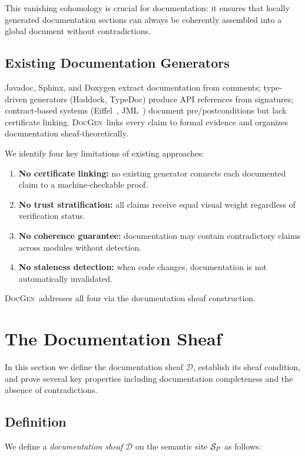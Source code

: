 \documentclass[11pt]{article}
\newcommand{\DocGen}{\textsc{DocGen}}
\newcommand{\DocSheaf}{\mathcal{D}}
\begin{document}
This vanishing cohomology is crucial for documentation: it ensures that
locally generated documentation sections can always be coherently
assembled into a global document without contradictions.

\subsection{Existing Documentation Generators}
Javadoc, Sphinx, and Doxygen extract documentation from comments;
type-driven generators (Haddock, TypeDoc) produce API references from
signatures; contract-based systems (Eiffel~\cite{Meyer1997},
JML~\cite{JML2005}) document pre/postconditions but lack certificate
linking.  \DocGen\ links every claim to formal evidence and organizes
documentation sheaf-theoretically.

We identify four key limitations of existing approaches:
\begin{enumerate}[noitemsep]
\item \textbf{No certificate linking:} no existing generator connects
  each documented claim to a machine-checkable proof.
\item \textbf{No trust stratification:} all claims receive equal
  visual weight regardless of verification status.
\item \textbf{No coherence guarantee:} documentation may contain
  contradictory claims across modules without detection.
\item \textbf{No staleness detection:} when code changes, documentation
  is not automatically invalidated.
\end{enumerate}
\DocGen\ addresses all four via the documentation sheaf construction.

\section{The Documentation Sheaf}\label{sec:doc-sheaf}

In this section we define the documentation sheaf $\DocSheaf$, establish
its sheaf condition, and prove several key properties including
documentation completeness and the absence of contradictions.

\subsection{Definition}
We define a \emph{documentation sheaf} $\DocSheaf$ on the semantic site
$\mathcal{S}_P$ as follows:
\end{document}
